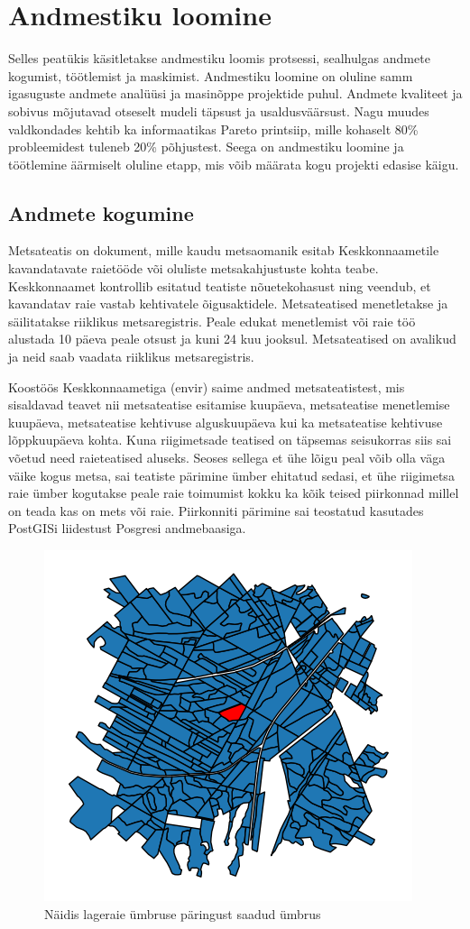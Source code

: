 \section{Andmestiku loomine}
Selles peatükis käsitletakse andmestiku loomis protsessi, sealhulgas andmete kogumist, töötlemist ja maskimist. Andmestiku loomine on oluline samm igasuguste andmete analüüsi ja masinõppe projektide puhul. Andmete kvaliteet ja sobivus mõjutavad otseselt mudeli täpsust ja usaldusväärsust. Nagu muudes valdkondades kehtib ka informaatikas Pareto printsiip, mille kohaselt 80\% probleemidest tuleneb 20\% põhjustest. Seega on andmestiku loomine ja töötlemine äärmiselt oluline etapp, mis võib määrata kogu projekti edasise käigu.

\subsection{Andmete kogumine}
Metsateatis on dokument, mille kaudu metsaomanik esitab Keskkonnaametile
kavandatavate raietööde või oluliste metsakahjustuste kohta teabe. Keskkonnaamet
kontrollib esitatud teatiste nõuetekohasust ning veendub, et kavandatav raie
vastab kehtivatele õigusaktidele. Metsateatised menetletakse ja säilitatakse
riiklikus metsaregistris. Peale edukat menetlemist või raie töö alustada 10 päeva peale otsust ja kuni 24 kuu jooksul. \cite{MetsateatisJaMetsaregister} Metsateatised on avalikud ja neid saab vaadata riiklikus metsaregistris.

Koostöös Keskkonnaametiga (envir) saime andmed metsateatistest, mis sisaldavad teavet nii metsateatise esitamise kuupäeva, metsateatise menetlemise kuupäeva, metsateatise kehtivuse alguskuupäeva kui ka metsateatise kehtivuse lõppkuupäeva kohta. Kuna riigimetsade teatised on täpsemas seisukorras siis sai võetud need raieteatised aluseks. Seoses sellega et ühe lõigu peal võib olla väga väike kogus metsa, sai teatiste pärimine ümber ehitatud sedasi, et ühe riigimetsa raie ümber kogutakse peale raie toimumist kokku ka kõik teised piirkonnad millel on teada kas on mets või raie. Piirkonniti pärimine sai teostatud kasutades PostGISi liidestust Posgresi andmebaasiga.

\begin{figure}[hb]
    \centering
    \includegraphics[width=.5\textwidth]{figures/andmestik/er_id_is10124223.png}
    \caption{Näidis lageraie ümbruse päringust saadud ümbrus}
    \label{fig:umbrusexample}
\end{figure}

